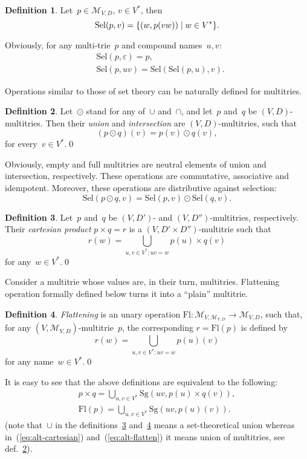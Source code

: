 \documentclass{article}
\theoremstyle{definition}
\newtheorem{Df}{Definition}
\newcommand{\set}[1]{\mathcal{#1}}
\newcommand{\setmt}[2]{\set{M}_{#1,#2}}
\newcommand{\flatten}{\mathrm{Fl}}
\newcommand{\select}{\mathrm{Sel}}
\newcommand{\singleleaf}{\mathrm{Sg}}
\begin{document}
\begin{Df}\label{def:select}
Let~$p\in\setmt{V}{D}$, $v\in V^\ast$, then
\[
  \select(p,v) = \{ (w, p(vw)) \mid w\in V^\ast \} .\qedhere
\]
\end{Df}

Obviously, for any multi-trie~$p$ and compound names~$u,v$:
\begin{eqnarray*}
  & \select(p,\varepsilon) = p ,\\
  & \select(p,uv) = \select(\select(p,u), v) .
\end{eqnarray*}

Operations similar to those of set theory can be naturally defined for multitries.

\begin{Df}\label{def:union-intersection}
Let~$\odot$ stand for any of~$\cup$ and~$\cap$, and let~$p$ and~$q$ be
$(V,D)$-multitries. Then their \emph{union} and \emph{intersection} are
$(V,D)$-multitries, such that
\[
  (p\odot q)(v) = p(v) \odot q(v) ,
\]
for every~$v\in V^\ast$.\qed
\end{Df}

Obviously, empty and full multitries are neutral elements of union and intersection,
respectively. These operations are commutative, associative and idempotent.
Moreover, these operations are distributive against selection:
\[
  \select(p\odot q, v) = \select(p, v) \odot \select(q, v) .
\]

\begin{Df}\label{def:cartesian}
Let~$p$ and~$q$ be $(V,D')$- and $(V,D'')$-multitries, respectively. Their
\emph{cartesian product} $p\times q = r$ is a $(V,D'\times D'')$-multitrie
such that
\[
  r(w) = \bigcup_{u,v\in V^\ast: uv = w} p(u) \times q(v)
\]
for any~$w\in V^\ast$.\qed
\end{Df}

Consider a multitrie whose values are, in their turn, multitries.
Flattening operation formally defined below turns it into a ``plain'' multitrie.
\begin{Df}\label{def:flatten}
\emph{Flattening} is an unary operation $\flatten : \setmt{V}{\setmt{V}{D}}
\to\setmt{V}{D}$, such that, for any $(V,\setmt{V}{D})$-multitrie~$p$, the
corresponding $r=\flatten(p)$ is defined by
\[
  r(w) = \bigcup_{u,v\in V^\ast: uv = w} p(u)(v)
\]
for any name~$w\in V^\ast$.\qed
\end{Df}

It is easy to see that the above definitions are equivalent to the following:
\begin{eqnarray}
  \label{eq:alt-cartesian}
  p\times q =
    \bigcup_{u,v\in V^\ast} \singleleaf(uv, p(u) \times q(v)) ,\\
  \label{eq:alt-flatten}
  \flatten(p) =
    \bigcup_{u,v\in V^\ast} \singleleaf(uv, p(u)(v)) .
\end{eqnarray}
(note that~$\cup$ in the definitions~\ref{def:cartesian} and~\ref{def:flatten}
means a set-theoretical union whereas in~(\ref{eq:alt-cartesian})
and~(\ref{eq:alt-flatten}) it means union of multitries, see
def.~\ref{def:union-intersection}).
\end{document}
